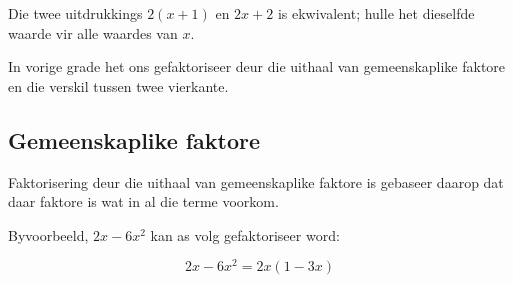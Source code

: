 Die twee uitdrukkings $2(x+1)$ en $2x+2$ is ekwivalent; hulle het dieselfde waarde vir alle waardes van $x$.
\par
% 
% 

\par
In vorige grade het ons gefaktoriseer deur die uithaal van gemeenskaplike faktore en die verskil tussen twee vierkante.

\par 
{}

\subsection*{Gemeenskaplike faktore}
\nopagebreak
Faktorisering deur die uithaal van gemeenskaplike faktore is gebaseer daarop dat daar faktore is wat in al die terme voorkom. \par

Byvoorbeeld, $2x-6{x}^{2}$ kan as volg gefaktoriseer word:\par 

\begin{equation*}
2x-6{x}^{2}=2x(1-3x)
\end{equation*}


% 


